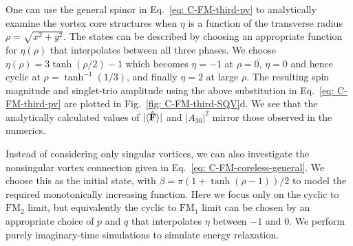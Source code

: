 One can use the general spinor in Eq.~\eqref{eq: C-FM-third-pv} to
analytically examine the vortex core structures when \(\eta \) is a
function of the transverse radius \(\rho = \sqrt{x^2 + y^2}\).
The states can be described by choosing an appropriate function for
\(\eta(\rho)\) that interpolates between all three phases.
We choose \(\eta(\rho) = 3\tanh(\rho/2) - 1\) which becomes \(\eta=-1\) at
\(\rho=0\), \(\eta=0\) and hence cyclic at \(\rho=\tanh^{-1}(1/3)\), and
finally \(\eta=2\) at large \(\rho \).
The resulting spin magnitude and singlet-trio amplitude using the above
substitution in Eq.~\eqref{eq: C-FM-third-pv} are plotted in
Fig.~\ref{fig: C-FM-third-SQV}d.
We see that the analytically calculated values of \(|\langle \hat{\vb{F}} \rangle | \) and
\(|A_{30}|^2\) mirror those observed in the numerics.

Instead of considering only singular vortices, we can also investigate the
nonsingular vortex connection given in Eq.~\eqref{eq: C-FM-coreless-general}.
We choose this as the initial state, with
\(\beta = \pi\left(1 + \tanh(\rho-1)\right)/2\) to model the required
monotonically increasing function.
Here we focus only on the cyclic to \(\text{FM}_2\) limit, but equivalently the
cyclic to \(\text{FM}_1\) limit can be chosen by an appropriate choice of \(p\)
and \(q\) that interpolates \(\eta \) between \(-1\) and \(0\).
We perform purely imaginary-time simulations to simulate energy relaxation.
